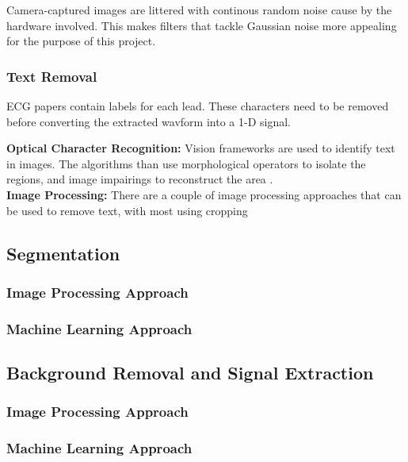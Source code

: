Camera-captured images are littered with continous random noise cause by the hardware involved. This makes filters that tackle Gaussian noise more appealing for the purpose of this project.

\subsubsection{Text Removal}

ECG papers contain labels for each lead. These characters need to be removed before converting the extracted wavform into a 1-D signal.

\textbf{Optical Character Recognition:} Vision frameworks are used to identify text in images. The algorithms than use morphological operators to isolate the regions, and image impairings to reconstruct the area \cite{Ganesh2021CombiningOC}.\\
\textbf{Image Processing:} There are a couple of image processing approaches that can be used to remove text, with most using cropping
\textbf{}

\subsection{Segmentation}

\subsubsection{Image Processing Approach}

\subsubsection{Machine Learning Approach}


\subsection{Background Removal and Signal Extraction}

\subsubsection{Image Processing Approach}

\subsubsection{Machine Learning Approach}


